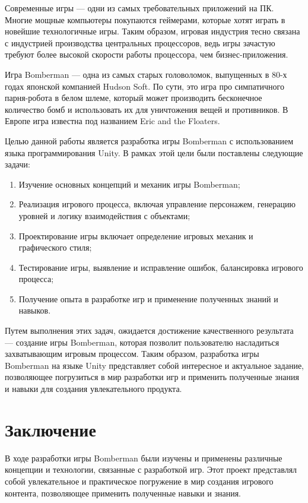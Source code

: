 \documentclass[14pt, oneside]{altsu-report}
\begin{document}
Современные игры --- одни из самых требовательных приложений на ПК. Многие мощные компьютеры покупаются геймерами, которые хотят играть в новейшие технологичные игры. Таким образом, игровая индустрия тесно связана с индустрией производства центральных процессоров, ведь игры зачастую требуют более высокой скорости работы процессора, чем бизнес-приложения.

Игра Bomberman –-- одна из самых старых головоломок, выпущенных в 80-х годах японской компанией Hudson Soft. По сути, это игра про симпатичного парня-робота в белом шлеме, который может производить бесконечное количество бомб и использовать их для уничтожения вещей и противников. В Европе игра известна под названием Eric and the Floaters.

Целью данной  работы является разработка игры Bomberman с использованием языка программирования Unity. В рамках этой цели были поставлены следующие задачи:

\begin{enumerate}
    \item Изучение основных концепций и механик игры Bomberman;
    \item Реализация игрового процесса, включая управление персонажем, генерацию уровней и логику взаимодействия с объектами;
    \item Проектирование игры включает определение игровых механик и графического стиля;
    \item Тестирование игры, выявление и исправление ошибок, балансировка игрового процесса;
    \item Получение опыта в разработке игр и применение полученных знаний и навыков.
\end{enumerate}

Путем выполнения этих задач, ожидается достижение качественного результата --- создание игры Bomberman, которая позволит пользователю насладиться захватывающим игровым процессом.
Таким образом, разработка игры Bomberman на языке Unity представляет собой интересное и актуальное задание, позволяющее погрузиться в мир разработки игр и применить полученные знания и навыки для создания увлекательного продукта.





\chapter*{Заключение}
В ходе разработки игры Bomberman были изучены и применены различные концепции и технологии, связанные с разработкой игр. Этот проект представлял собой увлекательное и практическое погружение в мир создания игрового контента, позволяющее применить полученные навыки и знания.
\end{document}
